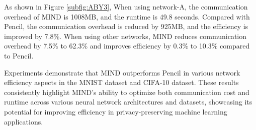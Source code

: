 \documentclass[conference]{IEEEtran}
\begin{document}
As shown in Figure \ref{subfig:ABY3}, When using network-A, the communication overhead of MIND is 1008MB, and the runtime is 49.8 seconds. Compared with Pencil, the communication overhead is reduced by 925MB, and the efficiency is improved by 7.8\%. When using other networks, MIND reduces communication overhead by 7.5\% to 62.3\% and improves efficiency by 0.3\% to 10.3\% compared to Pencil.

Experiments demonstrate that MIND outperforms Pencil in various network efficiency aspects in the MNIST dataset and CIFA-10 dataset. These results consistently highlight MIND's ability to optimize both communication cost and runtime across various neural network architectures and datasets, showcasing its potential for improving efficiency in privacy-preserving machine learning applications.
\end{document}
